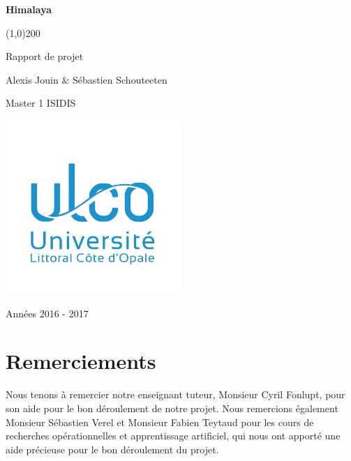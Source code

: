 \documentclass[french]{scrartcl}
\begin{document}
	
	\begin{titlepage}
		\begin{center}
			\vspace*{2cm}
			
			\Huge
			\textbf{Himalaya}
			
			\line(1,0){200}
			
			\vspace{0.5cm}
			\LARGE
			Rapport de projet
			
			\vspace{4.5cm}
			
			\large
			Alexis Jouin \& Sébastien Schouteeten
			
			\vspace{0.5cm}
			Master 1 ISIDIS
			
			\vfill
			
			\includegraphics[width=0.5\textwidth]{images/ulco}
			
			\vspace{0.8cm}
			
			\Large
			Années 2016 - 2017
			
		\end{center}
	\end{titlepage}
	
	\newpage
	
	\tableofcontents
	
	\newpage
	
	\section{Remerciements}
	Nous tenons à remercier notre enseignant tuteur, Monsieur Cyril Fonlupt, pour son aide pour le bon déroulement de notre projet. Nous remercions également Monsieur Sébastien Verel et Monsieur Fabien Teytaud pour les cours de recherches opérationnelles et apprentissage artificiel, qui nous ont apporté une aide précieuse pour le bon déroulement du projet.
	
\end{document}
